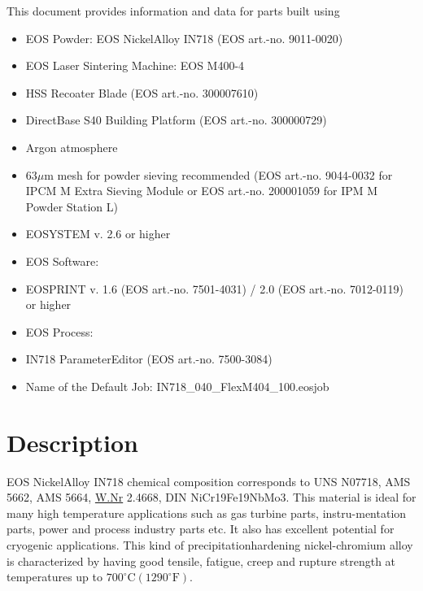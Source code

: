 \documentclass[10pt]{article}
\begin{document}
This document provides information and data for parts built using

\begin{itemize}
  \item EOS Powder: EOS NickelAlloy IN718 (EOS art.-no. 9011-0020)

  \item EOS Laser Sintering Machine: EOS M400-4

  \item HSS Recoater Blade (EOS art.-no. 300007610)

  \item DirectBase S40 Building Platform (EOS art.-no. 300000729)

  \item Argon atmosphere

  \item $63 \mu \mathrm{m}$ mesh for powder sieving recommended (EOS art.-no. 9044-0032 for IPCM M Extra Sieving Module or EOS art.-no. 200001059 for IPM M Powder Station L)

  \item EOSYSTEM v. 2.6 or higher

  \item EOS Software:

  \item EOSPRINT v. 1.6 (EOS art.-no. 7501-4031) / 2.0 (EOS art.-no. 7012-0119) or higher

  \item EOS Process:

  \item IN718 ParameterEditor (EOS art.-no. 7500-3084)

  \item Name of the Default Job: IN718\_040\_FlexM404\_100.eosjob

\end{itemize}

\section*{Description}
EOS NickelAlloy IN718 chemical composition corresponds to UNS N07718, AMS 5662, AMS 5664, \href{http://W.Nr}{W.Nr} 2.4668, DIN NiCr19Fe19NbMo3. This material is ideal for many high temperature applications such as gas turbine parts, instru-mentation parts, power and process industry parts etc. It also has excellent potential for cryogenic applications. This kind of precipitationhardening nickel-chromium alloy is characterized by having good tensile, fatigue, creep and rupture strength at temperatures up to $700^{\circ} \mathrm{C}\left(1290^{\circ} \mathrm{F}\right)$.
\end{document}

